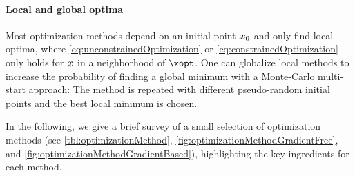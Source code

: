 \paragraph{Local and global optima}

Most optimization methods depend on an initial point ${\boldsymbol{x}}_0$ and
only find local optima,
where \eqref{eq:unconstrainedOptimization} or
\eqref{eq:constrainedOptimization} only holds for ${\boldsymbol{x}}$
in a neighborhood of $\xopt$.
One can globalize local methods to increase the probability
of finding a global minimum with a Monte-Carlo multi-start approach:
The method is repeated with different pseudo-random initial points
and the best local minimum is chosen.

In the following,
we give a brief survey of a small selection of optimization methods
(see
\cref{tbl:optimizationMethod},
\cref{fig:optimizationMethodGradientFree}, and
\cref{fig:optimizationMethodGradientBased}),
highlighting the key ingredients for each method.

